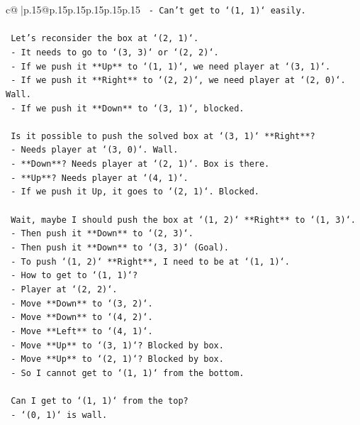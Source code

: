 \documentclass{article}
\begin{document}
{\begin{supertabular}{c@{$\;$}|p{.15\linewidth}@{}p{.15\linewidth}p{.15\linewidth}p{.15\linewidth}p{.15\linewidth}p{.15\linewidth}}
{{{\texttt{      {-} Can't get to `(1, 1)` easily.} \\
\\ 
\texttt{   Let's reconsider the box at `(2, 1)`.} \\
\texttt{   {-} It needs to go to `(3, 3)` or `(2, 2)`.} \\
\texttt{   {-} If we push it **Up** to `(1, 1)`, we need player at `(3, 1)`.} \\
\texttt{   {-} If we push it **Right** to `(2, 2)`, we need player at `(2, 0)`. Wall.} \\
\texttt{   {-} If we push it **Down** to `(3, 1)`, blocked.} \\
\\ 
\texttt{   Is it possible to push the solved box at `(3, 1)` **Right**?} \\
\texttt{   {-} Needs player at `(3, 0)`. Wall.} \\
\texttt{   {-} **Down**? Needs player at `(2, 1)`. Box is there.} \\
\texttt{   {-} **Up**? Needs player at `(4, 1)`.} \\
\texttt{     {-} If we push it Up, it goes to `(2, 1)`. Blocked.} \\
\\ 
\texttt{   Wait, maybe I should push the box at `(1, 2)` **Right** to `(1, 3)`.} \\
\texttt{   {-} Then push it **Down** to `(2, 3)`.} \\
\texttt{   {-} Then push it **Down** to `(3, 3)` (Goal).} \\
\texttt{   {-} To push `(1, 2)` **Right**, I need to be at `(1, 1)`.} \\
\texttt{   {-} How to get to `(1, 1)`?} \\
\texttt{     {-} Player at `(2, 2)`.} \\
\texttt{     {-} Move **Down** to `(3, 2)`.} \\
\texttt{     {-} Move **Down** to `(4, 2)`.} \\
\texttt{     {-} Move **Left** to `(4, 1)`.} \\
\texttt{     {-} Move **Up** to `(3, 1)`? Blocked by box.} \\
\texttt{     {-} Move **Up** to `(2, 1)`? Blocked by box.} \\
\texttt{     {-} So I cannot get to `(1, 1)` from the bottom.} \\
\\ 
\texttt{   Can I get to `(1, 1)` from the top?} \\
\texttt{   {-} `(0, 1)` is wall.} \\
}}}
\end{supertabular}}
\end{document}
